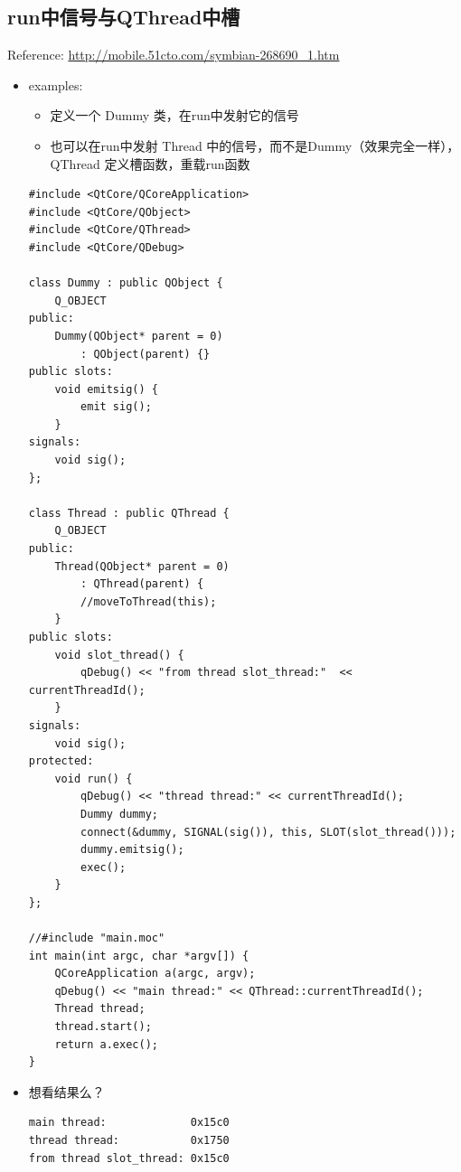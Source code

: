 \documentclass[9pt,b5paper]{article}
\begin{document}
\subsection{run中信号与QThread中槽}
\label{sec-3-4}
Reference: \url{http://mobile.51cto.com/symbian-268690_1.htm}
\begin{itemize}
\item examples:
\begin{itemize}
\item 定义一个 Dummy 类，在run中发射它的信号
\item 也可以在run中发射 Thread 中的信号，而不是Dummy（效果完全一样），QThread 定义槽函数，重载run函数
\end{itemize}
\lstset{language=java,label= ,caption= ,numbers=none}
\begin{lstlisting}
#include <QtCore/QCoreApplication>   
#include <QtCore/QObject>   
#include <QtCore/QThread>   
#include <QtCore/QDebug>    

class Dummy : public QObject {       
    Q_OBJECT
public:
    Dummy(QObject* parent = 0)
        : QObject(parent) {}   
public slots:
    void emitsig() {        
        emit sig();    
    }
signals:
    void sig();
};    

class Thread : public QThread {       
    Q_OBJECT
public:      
    Thread(QObject* parent = 0)
        : QThread(parent) {
        //moveToThread(this);
    }   
public slots:
    void slot_thread() {           
        qDebug() << "from thread slot_thread:"  << currentThreadId();
    }   
signals:
    void sig();
protected:
    void run() {           
        qDebug() << "thread thread:" << currentThreadId();          
        Dummy dummy;           
        connect(&dummy, SIGNAL(sig()), this, SLOT(slot_thread()));          
        dummy.emitsig();
        exec();       
    }   
};    

//#include "main.moc"
int main(int argc, char *argv[]) {       
    QCoreApplication a(argc, argv);       
    qDebug() << "main thread:" << QThread::currentThreadId();       
    Thread thread;       
    thread.start();       
    return a.exec();
}
\end{lstlisting}
\item 想看结果么？

\lstset{language=java,label= ,caption= ,numbers=none}
\begin{lstlisting}
main thread:             0x15c0 
thread thread:           0x1750 
from thread slot_thread: 0x15c0


\end{lstlisting}
\end{itemize}
\end{document}
